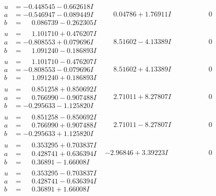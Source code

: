\documentclass[1p]{elsarticle_modified}
\theoremstyle{definition}
\begin{document}
$$\begin{array}{c|c|c}
\begin{aligned}
u &= -0.448545 - 0.662618 I \\
a &= -0.546947 - 0.089449 I \\
b &= \phantom{-}0.086739 - 0.262305 I\end{aligned}
 & \phantom{-}0.04786 + 1.76911 I & \phantom{-0.000000 } 0 \\ \hline\begin{aligned}
u &= \phantom{-}1.101710 + 0.476207 I \\
a &= -0.808553 + 0.079696 I \\
b &= \phantom{-}1.091240 - 0.186893 I\end{aligned}
 & \phantom{-}8.51602 - 4.13389 I & \phantom{-0.000000 } 0 \\ \hline\begin{aligned}
u &= \phantom{-}1.101710 - 0.476207 I \\
a &= -0.808553 - 0.079696 I \\
b &= \phantom{-}1.091240 + 0.186893 I\end{aligned}
 & \phantom{-}8.51602 + 4.13389 I & \phantom{-0.000000 } 0 \\ \hline\begin{aligned}
u &= \phantom{-}0.851258 + 0.850692 I \\
a &= \phantom{-}0.766990 - 0.907488 I \\
b &= -0.295633 - 1.125820 I\end{aligned}
 & \phantom{-}2.71011 + 8.27807 I & \phantom{-0.000000 } 0 \\ \hline\begin{aligned}
u &= \phantom{-}0.851258 - 0.850692 I \\
a &= \phantom{-}0.766990 + 0.907488 I \\
b &= -0.295633 + 1.125820 I\end{aligned}
 & \phantom{-}2.71011 - 8.27807 I & \phantom{-0.000000 } 0 \\ \hline\begin{aligned}
u &= \phantom{-}0.353295 + 0.703837 I \\
a &= \phantom{-}0.428741 + 0.636394 I \\
b &= \phantom{-}0.36891 - 1.66008 I\end{aligned}
 & -2.96846 + 3.39223 I & \phantom{-0.000000 } 0 \\ \hline\begin{aligned}
u &= \phantom{-}0.353295 - 0.703837 I \\
a &= \phantom{-}0.428741 - 0.636394 I \\
b &= \phantom{-}0.36891 + 1.66008 I\end{aligned}

\end{array}$$
\end{document}
